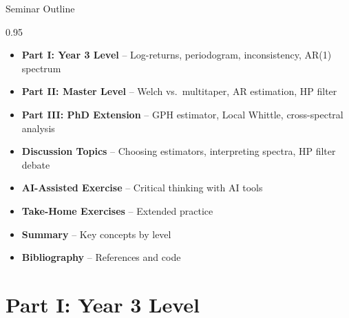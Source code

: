 \documentclass[9pt, aspectratio=169, t]{beamer}
\subtitle{Seminar 12: Spectral Analysis and Frequency-Domain Methods}
\begin{document}
{
\begin{frame}
    \titlepage
\end{frame}
}

\begin{frame}{Seminar Outline}
    \begin{cminipage}{0.95\textwidth}
    \begin{itemize}
        \item \textbf{Part I: Year 3 Level} -- Log-returns, periodogram, inconsistency, AR(1) spectrum
        \vspace{0.15cm}
        \item \textbf{Part II: Master Level} -- Welch vs.\ multitaper, AR estimation, HP filter
        \vspace{0.15cm}
        \item \textbf{Part III: PhD Extension} -- GPH estimator, Local Whittle, cross-spectral analysis
        \vspace{0.15cm}
        \item \textbf{Discussion Topics} -- Choosing estimators, interpreting spectra, HP filter debate
        \vspace{0.15cm}
        \item \textbf{AI-Assisted Exercise} -- Critical thinking with AI tools
        \vspace{0.15cm}
        \item \textbf{Take-Home Exercises} -- Extended practice
        \vspace{0.15cm}
        \item \textbf{Summary} -- Key concepts by level
        \vspace{0.15cm}
        \item \textbf{Bibliography} -- References and code
    \end{itemize}
    \end{cminipage}
\end{frame}

\section{Part I: Year 3 Level}
\end{document}
